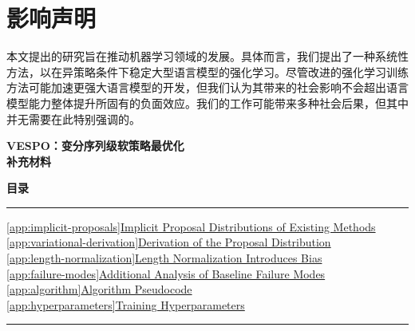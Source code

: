 \documentclass{article}
\theoremstyle{plain}
\theoremstyle{definition}
\theoremstyle{remark}
\begin{document}
\section*{影响声明}

本文提出的研究旨在推动机器学习领域的发展。具体而言，我们提出了一种系统性方法，以在异策略条件下稳定大型语言模型的强化学习。尽管改进的强化学习训练方法可能加速更强大语言模型的开发，但我们认为其带来的社会影响不会超出语言模型能力整体提升所固有的负面效应。我们的工作可能带来多种社会后果，但其中并无需要在此特别强调的。








\newpage
\appendix
\onecolumn

\begin{center}
  {\Large\bfseries VESPO：变分序列级软策略最优化 \\ 补充材料}
\end{center}
\vspace{1em}

\noindent\textbf{目录}
\vspace{0.3em}
\hrule  
\vspace{0.5em}
\noindent
\hyperref[app:implicit-proposals]{\ref{app:implicit-proposals}\hspace{1em}Implicit Proposal Distributions of Existing Methods\dotfill\pageref{app:implicit-proposals}}\\[0.3em]  
\hyperref[app:variational-derivation]{\ref{app:variational-derivation}\hspace{1em}Derivation of the Proposal Distribution\dotfill\pageref{app:variational-derivation}}\\[0.3em]  
\hyperref[app:length-normalization]{\ref{app:length-normalization}\hspace{1em}Length Normalization Introduces Bias\dotfill\pageref{app:length-normalization}}\\[0.3em]  
\hyperref[app:failure-modes]{\ref{app:failure-modes}\hspace{1em}Additional Analysis of Baseline Failure Modes\dotfill\pageref{app:failure-modes}}\\[0.3em]  
\hyperref[app:algorithm]{\ref{app:algorithm}\hspace{1em}Algorithm Pseudocode\dotfill\pageref{app:algorithm}}\\[0.3em]
\hyperref[app:hyperparameters]{\ref{app:hyperparameters}\hspace{1em}Training Hyperparameters\dotfill\pageref{app:hyperparameters}}
\vspace{0.5em}
\hrule  
\vspace{1.5em}
\end{document}
